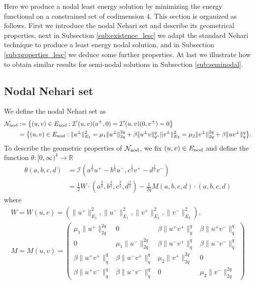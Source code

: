 \documentclass[reqno]{amsart}
\begin{document}
Here we produce a nodal least energy solution by minimizing the energy functional on
a constrained set of codimension 4.
This section is organized as follows. First we introduce the nodal Nehari set and
describe its geometrical properties, next in Subsection \ref{sub:existence_lesc}
we adapt the standard Nehari technique to produce a least energy nodal solution,
and in Subsection \ref{sub:properties_lesc} we deduce some further properties.
At last we illustrate how to obtain similar results for semi-nodal solutions in
Subsection \ref{sub:seminodal}.

\subsection{Nodal Nehari set}
We define the nodal Nehari set as
\begin{equation} \label{def:Neharinod}
 \begin{aligned}
 \mathcal N_{\rm nod}&:=  \big\{ (u,v)\in E_{\rm nod}  :
 \mathcal I'(u,v)(u^{\pm},0)= \mathcal I'(u,v) (0,v^{\pm})=0 \big\}\\
 &=  \big\{ (u,v)\in E_{\rm nod}  : \|u^{\pm}\|_{E_1}^2= \mu_1 \|u^{\pm}\|_{2q}^{2q}
  + \beta \|u^{\pm} v\|_{q}^q,
  \|v^{\pm}\|_{E_2}^2= \mu_2 \|v^{\pm}\|_{2q}^{2q} + \beta \|u v^{\pm} \|_{q}^q \big\}.
\end{aligned}
\end{equation}
To describe the geometric properties of $\mathcal N_{\rm nod}$,
we fix  $(u,v)\in  E_{\rm nod}$ and define the function $\theta:[0,\infty)^4 \to \mathbb{R}$
\begin{equation} \label{def:theta}
\begin{aligned}
 \theta(a,b,c,d)
& = \mathcal I (a^{\frac{1}{q}} u^+ -b^{\frac{1}q} u^-, c^{\frac{1}q} v^+ -d^{\frac{1}q} v^-)
\\
& = \frac{1}2  W \cdot (a^{\frac{2}{q}} , b^{\frac{2}q} ,
c^{\frac{2}q} ,d^{\frac{2}q} ) - \frac{1}{2q} M (a,b,c,d) \cdot (a,b,c,d)
\end{aligned}
\end{equation}
where
\begin{gather}\label{def:W}
 W=W(u,v)= \left( \|u^+\|_{E_1}^2 , \|u^-\|_{E_1}^2 , \|v^+\|_{E_2}^2 ,
 \|v^-\|_{E_2}^2 \right), \\
\label{def:M}
 M=M(u,v)= \begin{pmatrix}
 \mu_1\|u^+\|_{2q}^{2q} & 0 & \beta \|u^+v^+\|_q^q & \beta \|u^+v^-\|_q^q\\
 0&  \mu_1\|u^-\|_{2q}^{2q} & \beta \|u^-v^+\|_q^q & \beta \|u^-v^-\|_q^q\\
 \beta \|u^+v^+\|_q^q & \beta \|u^-v^+\|_q^q &  \mu_2 \|v^+\|_{2q}^{2q} & 0 \\
 \beta \|u^+v^-\|_q^q& \beta \|u^-v^-\|_q^q& 0& \mu_2\|v^-\|_{2q}^{2q}
 \end{pmatrix}
\end{gather}
\end{document}

